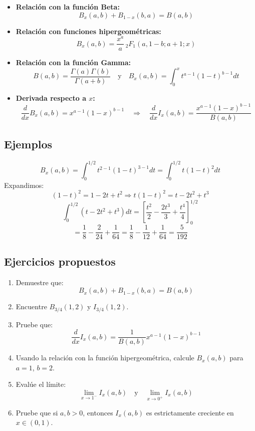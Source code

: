 \begin{itemize}
	\item \textbf{Relación con la función Beta:}
	      \[
		      B_x(a,b) + B_{1-x}(b, a) = B(a,b)
	      \]

	\item \textbf{Relación con funciones hipergeométricas:}
	      \[
		      B_x(a,b) = \frac{x^a}{a} \, {}_2F_1(a, 1 - b; a+1; x)
	      \]

	\item \textbf{Relación con la función Gamma:}
	      \[
		      B(a,b) = \frac{\Gamma(a)\Gamma(b)}{\Gamma(a + b)}
		      \quad \text{y} \quad
		      B_x(a,b) = \int_0^x t^{a-1}(1 - t)^{b-1} dt
	      \]

	\item \textbf{Derivada respecto a \( x \):}
	      \[
		      \frac{d}{dx} B_x(a,b) = x^{a-1}(1 - x)^{b-1}
		      \quad \Rightarrow \quad
		      \frac{d}{dx} I_x(a,b) = \frac{x^{a-1}(1 - x)^{b-1}}{B(a,b)}
	      \]
\end{itemize}

\subsection{  Ejemplos}


\begin{solution}
	\[
		B_x(a,b) = \int_0^{1/2} t^{2-1}(1 - t)^{3-1} dt = \int_0^{1/2} t(1 - t)^2 dt
	\]
	Expandimos:
	\[
		(1 - t)^2 = 1 - 2t + t^2 \Rightarrow t(1 - t)^2 = t - 2t^2 + t^3
	\]
	\[
		\int_0^{1/2} (t - 2t^2 + t^3) dt = \left[\frac{t^2}{2} - \frac{2t^3}{3} + \frac{t^4}{4} \right]_0^{1/2}
	\]
	\[
		= \frac{1}{8} - \frac{2}{24} + \frac{1}{64} = \frac{1}{8} - \frac{1}{12} + \frac{1}{64} = \frac{5}{192}
	\]
\end{solution}

\subsection{  Ejercicios propuestos}

\begin{enumerate}

	\item  Demuestre que:
	      \[
		      B_x(a,b) + B_{1-x}(b,a) = B(a,b)
	      \]

	\item 	Encuentre \( B_{3/4}(1,2) \) y \( I_{3/4}(1,2) \).
	\item 	Pruebe que:
	      \[
		      \frac{d}{dx} I_x(a,b) = \frac{1}{B(a,b)} x^{a-1}(1 - x)^{b-1}
	      \]
	\item 	Usando la relación con la función hipergeométrica, calcule \( B_x(a,b) \) para \( a = 1 \), \( b = 2 \).
	\item
	      Evalúe el límite:
	      \[
		      \lim_{x \to 1^{-}} I_x(a,b)
		      \quad \text{y} \quad
		      \lim_{x \to 0^{+}} I_x(a,b)
	      \]
	\item
	      Pruebe que si \( a, b > 0 \), entonces \( I_x(a,b) \) es estrictamente creciente en \( x \in (0,1) \).
\end{enumerate}

